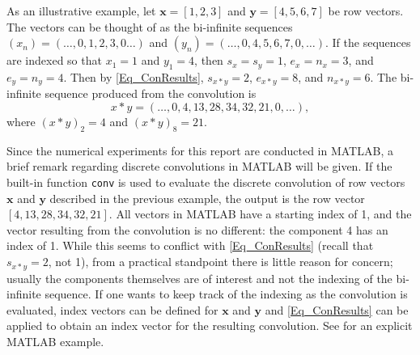 \documentclass[12pt]{article}
\begin{document}
As an illustrative example, let $\mathbf{x} = [1,2,3]$ and $\mathbf{y} = [4,5,6,7]$ be row vectors. The vectors can be thought of as the bi-infinite sequences $(x_n) = (\ldots,0,1,2,3,0\ldots)$ and $(y_n) = (\ldots,0,4,5,6,7,0,\ldots)$. If the sequences are indexed so that $x_1 = 1$ and $y_1 = 4$, then $s_x = s_y = 1$, $e_x = n_x = 3$, and $e_y = n_y = 4$. Then by \eqref{Eq_ConResults}, $s_{x*y} = 2$, $e_{x*y} = 8$, and $n_{x*y} = 6$. The bi-infinite sequence produced from the convolution is
\[x*y = (\ldots,0,4,13,28,34,32,21,0,\ldots),\]
where $(x*y)_2 = 4$ and $(x*y)_8 = 21$. \par 
Since the numerical experiments for this report are conducted in MATLAB, a brief remark regarding discrete convolutions in MATLAB will be given. If the built-in function \texttt{conv} is used to evaluate the discrete convolution of row vectors $\mathbf{x}$ and $\mathbf{y}$ described in the previous example, the output is the row vector $[4,13,28,34,32,21]$.  All vectors in MATLAB have a starting index of 1, and the vector resulting from the convolution is no different: the component 4 has an index of 1. While this seems to conflict with \eqref{Eq_ConResults} (recall that $s_{x*y} = 2$, not 1), from a practical standpoint there is little reason for concern; usually the components themselves are of interest and not the indexing of the bi-infinite sequence. If one wants to keep track of the indexing as the convolution is evaluated, index vectors can be defined for $\mathbf{x}$ and $\mathbf{y}$ and \eqref{Eq_ConResults} can be applied to obtain an index vector for the resulting convolution. See \cite{BoggessAlbert2001Afci} for an explicit MATLAB example. \par 
\end{document}
